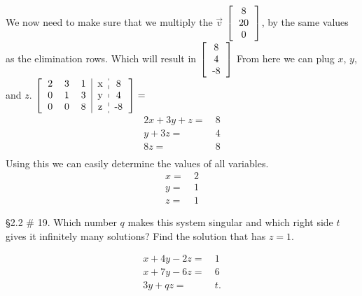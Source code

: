 \documentclass[]{exam}
\begin{document}
\begin{questions}
\begin{solution}
	   We now need to make sure that we multiply the $\vec{v}$ $\begin{bmatrix}\begin{tabular}{c} 8 \\ 20 \\ 0 
	   \end{tabular}\end{bmatrix}$, by the same values as the elimination rows. Which will result in $\begin{bmatrix}\begin{tabular}{c} 8 \\ 4 \\ -8 
	   \end{tabular}\end{bmatrix}$
	   From here we can plug $x$, $y$, and $z$.
	   $\begin{bmatrix}\begin{tabular}{ccc|c:c}
	       2 & 3 & 1 & x & 8 \\
	       0 & 1 & 3 & y & 4 \\
	       0 & 0 & 8 & z & -8 \\
	   \end{tabular} \end{bmatrix}=$
	   \begin{align*} 
	        2x + 3y + z =&\ 8 \\
	           y + 3z = &\ 4 \\
	             8z = &\ 8 \\
	   \end{align*}
	   Using this we can easily determine the values of all variables. 
	   \begin{align*}
	       x = &\ 2 \\
	       y = &\ 1 \\
	       z = &\ 1
	   \end{align*}
	   
	\end{solution}
	
	
	\question \S 2.2 \# 19. Which number $q$ makes this system singular and which right side $t$ gives it infinitely many solutions? Find the solution that has $z = 1$. 
	
	\begin{align*}
	x + 4y -2z =&\ 1\\
	x + 7y - 6z =&\ 6\\
	3y + qz =&\ t.\\
	\end{align*}
	

\end{questions}
\end{document}
